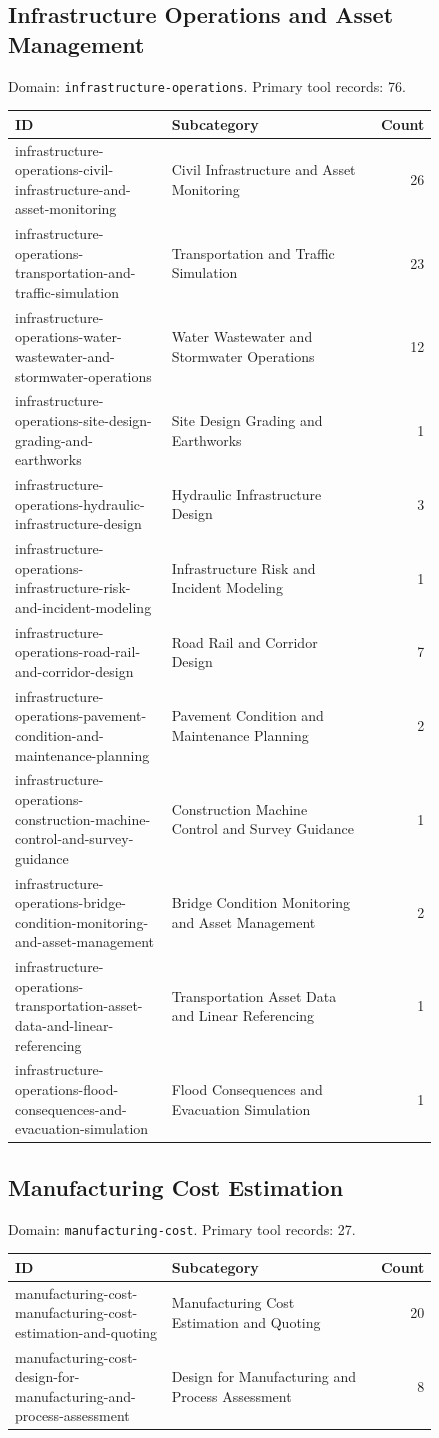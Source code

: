 \subsection{Infrastructure Operations and Asset Management}
\noindent Domain: \texttt{infrastructure-operations}. Primary tool records: 76.
\begin{longtable}{p{0.37\linewidth}p{0.47\linewidth}r}
ID & Subcategory & Count\\\hline\endhead
infrastructure-operations-civil-infrastructure-and-asset-monitoring & Civil Infrastructure and Asset Monitoring & 26\\
infrastructure-operations-transportation-and-traffic-simulation & Transportation and Traffic Simulation & 23\\
infrastructure-operations-water-wastewater-and-stormwater-operations & Water Wastewater and Stormwater Operations & 12\\
infrastructure-operations-site-design-grading-and-earthworks & Site Design Grading and Earthworks & 1\\
infrastructure-operations-hydraulic-infrastructure-design & Hydraulic Infrastructure Design & 3\\
infrastructure-operations-infrastructure-risk-and-incident-modeling & Infrastructure Risk and Incident Modeling & 1\\
infrastructure-operations-road-rail-and-corridor-design & Road Rail and Corridor Design & 7\\
infrastructure-operations-pavement-condition-and-maintenance-planning & Pavement Condition and Maintenance Planning & 2\\
infrastructure-operations-construction-machine-control-and-survey-guidance & Construction Machine Control and Survey Guidance & 1\\
infrastructure-operations-bridge-condition-monitoring-and-asset-management & Bridge Condition Monitoring and Asset Management & 2\\
infrastructure-operations-transportation-asset-data-and-linear-referencing & Transportation Asset Data and Linear Referencing & 1\\
infrastructure-operations-flood-consequences-and-evacuation-simulation & Flood Consequences and Evacuation Simulation & 1\\
\end{longtable}
\subsection{Manufacturing Cost Estimation}
\noindent Domain: \texttt{manufacturing-cost}. Primary tool records: 27.
\begin{longtable}{p{0.37\linewidth}p{0.47\linewidth}r}
ID & Subcategory & Count\\\hline\endhead
manufacturing-cost-manufacturing-cost-estimation-and-quoting & Manufacturing Cost Estimation and Quoting & 20\\
manufacturing-cost-design-for-manufacturing-and-process-assessment & Design for Manufacturing and Process Assessment & 8\\
\end{longtable}
